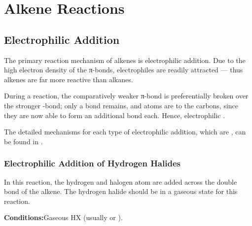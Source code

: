 



	\pagebreak
	\section{Alkene Reactions}

	\subsection{Electrophilic Addition}

		The primary reaction mechanism of alkenes is electrophilic addition. Due to the high electron density of the π-bonds,
		electrophiles are readily attracted --- thus alkenes are far more reactive than alkanes.

		During a reaction, the comparatively weaker π-bond is preferentially broken over the stronger \chemsigma-bond; only a
		 bond remains, and atoms are  to the carbons, since they are now able to form an additional
		bond each. Hence, electrophilic .

		The detailed mechanisms for each type of electrophilic addition, which are , can be found
		in \hyperlink{AppendixElectrophilicAddition}{}.

		\subsubsection{Electrophilic Addition of Hydrogen Halides}

			In this reaction, the hydrogen and halogen atom are added across the double bond of the alkene. The hydrogen halide
			should be in a gaseous state for this reaction.

			\vspace{1.5em}
			\vbox{\textbf{Conditions:}\tabto{35mm}Gaseous HX (usually  or ).}


